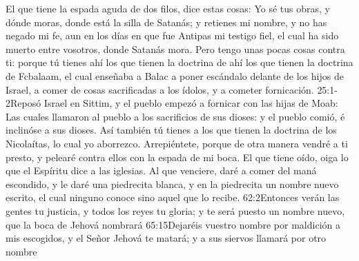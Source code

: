 El que tiene la espada aguda de dos filos,%
 dice estas cosas:
Yo sé tus obras, y dónde moras,%
 donde está la silla de Satanás; y retienes mi nombre, y no has negado mi fe, aun en los días en que fue Antipas mi testigo fiel, el cual ha sido muerto entre vosotros, donde Satanás mora. %
Pero tengo unas pocas cosas contra ti: porque tú tienes ahí los que tienen la doctrina de ahí los que tienen la doctrina de Fcbalaam, el cual enseñaba a Balac a poner escándalo delante de los hijos de Israel, a comer de cosas sacrificadas a los ídolos, y a cometer fornicación.%
								{25:1-2}{Reposó Israel en Sittim, y el pueblo empezó a fornicar con las hijas de Moab: Las cuales llamaron al pueblo a los sacrificios de sus dioses: y el pueblo comió, é inclinóse a sus dioses.}
Así también tú tienes a los que tienen la doctrina de los Nicolaítas, lo cual yo aborrezco. %
Arrepiéntete, porque de otra manera vendré a ti presto, y pelearé contra ellos con la espada de mi boca.%
El que tiene oído, oiga lo que el Espíritu dice a las iglesias. Al que venciere, daré a comer del maná escondido,%
 y le daré una piedrecita blanca, y en la piedrecita un nombre nuevo escrito, el cual ninguno conoce sino aquel que lo recibe.
					{62:2}{Entonces verán las gentes tu justicia, y todos los reyes tu gloria; y te será puesto un nombre nuevo, que la boca de Jehová nombrará}
					{65:15}{Dejaréis vuestro nombre por maldición a mis escogidos, y el Señor Jehová te matará; y a sus siervos llamará por otro nombre}
